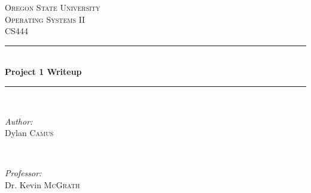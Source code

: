 \documentclass[letterpaper,draftclsnofoot,onecolumn,10pt]{article}
\begin{document}
\begin{titlepage}

\newcommand{\HRule}{\rule{\linewidth}{0.5mm}} %

\center %
 

\textsc{\LARGE Oregon State University}\\[1.5cm] %
\textsc{\Large Operating Systems II}\\[0.5cm] %
\textsc{\large CS444}\\[0.5cm] %


\HRule \\[0.4cm]
{ \huge \bfseries Project 1 Writeup}\\[0.4cm] %
\HRule \\[1.5cm]
 

\begin{minipage}{0.4\textwidth}
   \begin{flushleft} \large
      \emph{Author:}\\
      Dylan \textsc{Camus} %
   \end{flushleft}
\end{minipage}
~
\begin{minipage}{0.4\textwidth}
   \begin{flushright} \large
      \emph{Professor:} \\
      Dr. Kevin \textsc{McGrath} %
   \end{flushright}
\end{minipage}\\[4cm]



\end{titlepage}
\end{document}
